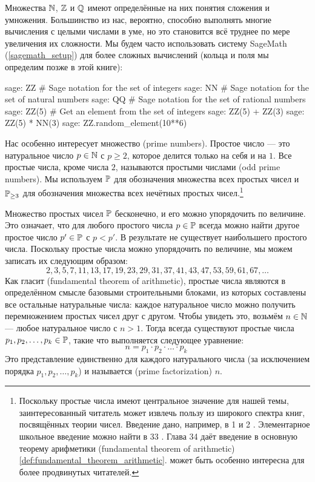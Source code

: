 Множества $\mathbb{N}$, $\mathbb{Z}$ и $\mathbb{Q}$ имеют определённые на них понятия сложения и умножения. Большинство из нас, вероятно, способно выполнять многие вычисления с целыми числами в уме, но это становится всё труднее по мере увеличения их сложности. Мы будем часто использовать систему SageMath (\ref{sagemath_setup}) для более сложных вычислений (кольца и поля мы определим позже в этой книге):
\begin{sagecommandline}
sage: ZZ #  Sage notation for the set of integers
sage: NN # Sage notation for the set of natural numbers
sage: QQ # Sage notation for the set of rational numbers
sage: ZZ(5) # Get an element from the set of integers
sage: ZZ(5) + ZZ(3)
sage: ZZ(5) * NN(3)
sage: ZZ.random_element(10**6)
\end{sagecommandline}

Нас особенно интересует множество  (prime numbers). Простое число — это натуральное число $ p \in \mathbb{N} $ с $ p \geq 2 $, которое делится только на себя и на $1$. Все простые числа, кроме числа $ 2 $, называются  простыми числами (odd prime numbers). Мы используем $ \mathbb{P} $ для обозначения множества всех простых чисел и $ \mathbb{P} _{\geq 3} $ для обозначения множества всех нечётных простых чисел.\footnote{Поскольку простые числа имеют центральное значение для нашей темы, заинтересованный читатель может извлечь пользу из широкого спектра книг, посвящённых теории чисел. Введение дано, например, в \chaptname{} 1 и 2 \cite{hardy-2008}. Элементарное школьное введение можно найти в \chaptname{} 33 \cite{wu-1}. Глава 34 \cite{wu-1} даёт введение в основную теорему арифметики (fundamental theorem of arithmetic) \eqref{def:fundamental_theorem_arithmetic}. \cite{fine-2016} может быть особенно интересна для более продвинутых читателей.}

Множество простых чисел $\mathbb{P}$ бесконечно, и его можно упорядочить по величине. Это означает, что для любого простого числа $p\in\mathbb{P}$ всегда можно найти другое простое число $p'\in\mathbb{P}$ с $p<p'$. В результате не существует наибольшего простого числа. Поскольку простые числа можно упорядочить по величине, мы можем записать их следующим образом:
\begin{equation}
\label{eq: primenumber_sequence}
2, 3, 5, 7, 11, 13, 17, 19, 23, 29, 31, 37, 41, 43, 47, 53, 59, 61, 67, \ldots
\end{equation}
Как гласит  (fundamental theorem of arithmetic), простые числа являются в определённом смысле базовыми строительными блоками, из которых составлены все остальные натуральные числа: каждое натуральное число можно получить перемножением простых чисел друг с другом. Чтобы увидеть это, возьмём $ n \in \mathbb{N} $ — любое натуральное число с $n>1$. Тогда всегда существуют простые числа $ p_1, p_2, \ldots, p_k \in \mathbb{P} $, такие что выполняется следующее уравнение:
\begin{equation}
\label{def:fundamental_theorem_arithmetic}
n = p_1 \cdot p_2 \cdot \ldots \cdot p_k \;
\end{equation}
Это представление единственно для каждого натурального числа (за исключением порядка  $ p_1, p_2, \ldots, p_k$) и называется  (prime factorization) $n$.

